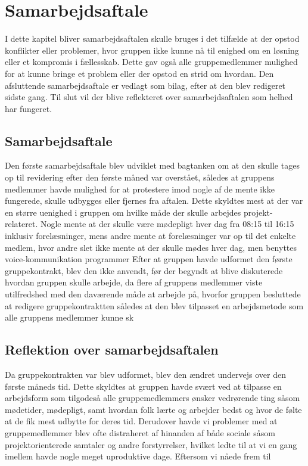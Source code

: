 \chapter{Samarbejdsaftale}\label{Samarbejdesaftale}
I dette kapitel bliver samarbejdsaftalen skulle bruges i det tilfælde at der opstod konflikter eller problemer, hvor gruppen ikke kunne nå til enighed om en løsning eller et kompromis i fællesskab. Dette gav også alle gruppemedlemmer mulighed for at kunne bringe et problem eller  der opstod en strid om hvordan. Den afsluttende samarbejdsaftale er vedlagt som bilag, efter at den blev redigeret sidste gang. Til slut vil der blive reflekteret over samarbejdsaftalen som helhed har fungeret.

\section{Samarbejdsaftale}

Den første samarbejdsaftale blev udviklet med bagtanken om at den skulle tages op til revidering efter den første måned var overstået, således at gruppens medlemmer havde mulighed for at protestere imod nogle af de mente ikke fungerede, skulle udbygges eller fjernes fra aftalen. Dette skyldtes mest at der var en større uenighed i gruppen om hvilke måde der skulle arbejdes projekt-relateret. Nogle mente at der skulle være mødepligt hver dag fra 08:15 til 16:15 inklusiv forelæsninger, mens andre mente at forelæsninger var op til det enkelte medlem, hvor andre slet ikke mente at der skulle mødes hver dag, men benyttes voice-kommunikation programmer 
Efter at gruppen havde udformet den første gruppekontrakt, blev den ikke anvendt, før der begyndt at blive diskuterede hvordan gruppen skulle arbejde, da flere af gruppens medlemmer viste utilfredshed med den daværende måde at arbejde på, hvorfor gruppen besluttede at redigere gruppekontraktten således at den blev tilpasset en arbejdsmetode som alle gruppens medlemmer kunne sk

\section{Reflektion over samarbejdsaftalen}\label{Reflektion-over-samarbejdsaftale}
Da gruppekontrakten var blev udformet, blev den ændret undervejs over den første måneds tid. Dette skyldtes at gruppen havde svært ved at tilpasse en arbejdsform som tilgodeså alle gruppemedlemmers ønsker vedrørende ting såsom mødetider, mødepligt, samt hvordan folk lærte og arbejder bedst og hvor de følte at de fik mest udbytte for deres tid. Derudover havde vi problemer med at gruppemedlemmer blev ofte distraheret af hinanden af både sociale såsom projektorienterede samtaler og andre forstyrrelser, hvilket ledte til at vi en gang imellem havde nogle meget uproduktive dage. Eftersom vi nåede frem til 